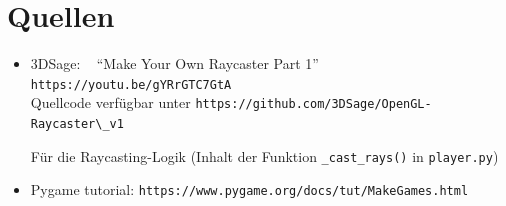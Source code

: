\documentclass[a4paper,titlepage]{article}
\begin{document}
\newpage

\section{Quellen}

\begin{itemize}
	\item 3DSage: ~ ``Make Your Own Raycaster Part 1'' ~ \verb|https://youtu.be/gYRrGTC7GtA|\\ Quellcode verfügbar unter \verb|https://github.com/3DSage/OpenGL-Raycaster\_v1|
	
	Für die Raycasting-Logik (Inhalt der Funktion \verb|_cast_rays()| in \verb|player.py|)
	
	\item Pygame tutorial: \verb|https://www.pygame.org/docs/tut/MakeGames.html|
\end{itemize}
\end{document}
